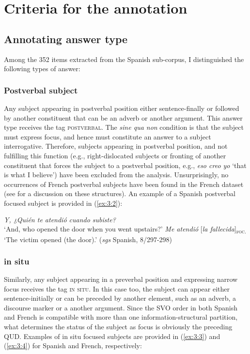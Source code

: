 \section{Criteria for the annotation} \label{sub:4.4}
\subsection{Annotating answer type} \label{sub:4.4.1}
Among the 352 items extracted from the Spanish sub-corpus, I distinguished the following types of answer: 

\subsubsection{Postverbal subject}
Any subject appearing in postverbal position either sentence-finally or followed by another constituent that can be an adverb or another argument. This answer type receives the tag \textsc{postverbal}. The \textit{sine qua non} condition is that the subject must express focus, and hence must constitute an answer to a subject interrogative. Therefore, subjects appearing in postverbal position, and not fulfilling this function (e.g., right-dislocated subjects or fronting of another constituent that forces the subject to a postverbal position, e.g., \textit{eso creo yo} `that is what I believe') have been excluded from the analysis. Unsurprisingly, no occurrences of French postverbal subjects have been found in the French dataset (see  for a discussion on these structures). An example of a Spanish postverbal focused subject is provided in (\ref{ex:3:2}):
    
\ea \label{ex:3:2}
\ea \textit{Y, ¿Quién te atendió cuando subiste?} \\
 ‘And, who opened the door when you went upstairs?'
\ex \textit{Me atendió} [\textit{la fallecida}]\textsubscript{\textsc{foc.}}\normalsize \\
‘The victim opened (the door).' \hfill (\textit{sgs} Spanish, 8/297-298)   
\z \z

\subsubsection{in situ}
Similarly, any subject appearing in a preverbal position and expressing narrow focus receives the tag \textsc{in situ}. In this case too, the subject can appear either sentence-initially or can be preceded by another element, such as an adverb, a discourse marker or a another argument. Since the SVO order in both Spanish and French is compatible with more than one information-structural partition, what determines the status of the subject as focus is obviously the preceding QUD. Examples of in situ focused subjects are provided in (\ref{ex:3:3}) and (\ref{ex:3:4}) for Spanish and French, respectively:

